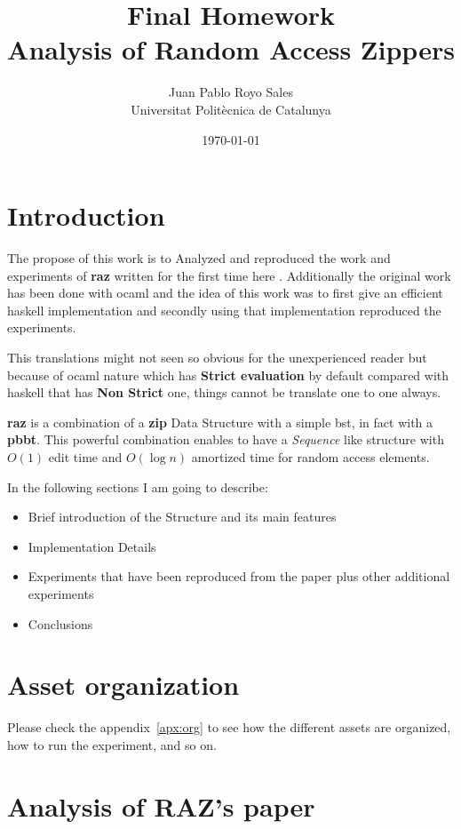 \documentclass[12pt, a4paper]{article}
\title{%
      Final Homework\\
      Analysis of Random Access Zippers
}
\author{%
  Juan Pablo Royo Sales \\
  \small{Universitat Politècnica de Catalunya}
}
\date\today
\begin{document}
\maketitle

\section{Introduction}\label{sec:intro}
The propose of this work is to Analyzed and reproduced the work and experiments of \textbf{\acrfull{raz}} written for the first time here \cite{raz}. Additionally the original work has been done with \acrfull{ocaml} and the idea of this work was to first give an efficient \acrfull{haskell} implementation and secondly using that implementation reproduced the experiments.

This translations might not seen so obvious for the unexperienced reader but because of \acrshort{ocaml} nature which has \textbf{Strict evaluation} by default compared with \acrshort{haskell} that has \textbf{Non Strict} one, things cannot be translate one to one always.

\textbf{\acrfull{raz}} is a combination of a \textbf{\acrfull{zip}} Data Structure with a simple \acrfull{bst}, in fact with a \textbf{\acrfull{pbbt}}. This powerful combination enables to have a \textit{Sequence} like structure with $O(1)$ edit time and $O(\log{n})$ amortized time for random access elements.

In the following sections I am going to describe:

\begin{itemize}
 \item Brief introduction of the Structure and its main features
 \item Implementation Details
 \item Experiments that have been reproduced from the paper plus other additional experiments
 \item Conclusions
\end{itemize}

\section{Asset organization}
Please check the appendix~\ref{apx:org} to see how the different assets are organized, how to run the experiment, and so on.

\section{Analysis of RAZ's paper}
\end{document}
